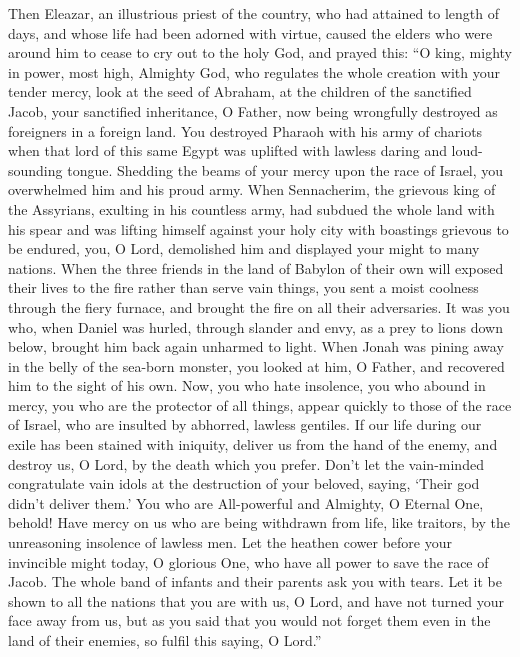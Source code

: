  Then Eleazar, an illustrious priest of the country, who had
attained to length of days, and whose life had been adorned with virtue,
caused the elders who were around him to cease to cry out to the holy
God, and prayed this:  ``O king, mighty in power, most high,
Almighty God, who regulates the whole creation with your tender mercy,
 look at the seed of Abraham, at the children of the
sanctified Jacob, your sanctified inheritance, O Father, now being
wrongfully destroyed as foreigners in a foreign land.  You
destroyed Pharaoh with his army of chariots when that lord of this same
Egypt was uplifted with lawless daring and loud-sounding tongue.
Shedding the beams of your mercy upon the race of Israel, you
overwhelmed him and his proud army.  When Sennacherim, the
grievous king of the Assyrians, exulting in his countless army, had
subdued the whole land with his spear and was lifting himself against
your holy city with boastings grievous to be endured, you, O Lord,
demolished him and displayed your might to many nations. 
When the three friends in the land of Babylon of their own will exposed
their lives to the fire rather than serve vain things, you sent a moist
coolness through the fiery furnace, and brought the fire on all their
adversaries.  It was you who, when Daniel was hurled,
through slander and envy, as a prey to lions down below, brought him
back again unharmed to light.  When Jonah was pining away in
the belly of the sea-born monster, you looked at him, O Father, and
recovered him to the sight of his own.  Now, you who hate
insolence, you who abound in mercy, you who are the protector of all
things, appear quickly to those of the race of Israel, who are insulted
by abhorred, lawless gentiles.  If our life during our
exile has been stained with iniquity, deliver us from the hand of the
enemy, and destroy us, O Lord, by the death which you prefer.
 Don't let the vain-minded congratulate vain idols at the
destruction of your beloved, saying, `Their god didn't deliver them.'
 You who are All-powerful and Almighty, O Eternal One,
behold! Have mercy on us who are being withdrawn from life, like
traitors, by the unreasoning insolence of lawless men.  Let
the heathen cower before your invincible might today, O glorious One,
who have all power to save the race of Jacob.  The whole
band of infants and their parents ask you with tears.  Let
it be shown to all the nations that you are with us, O Lord, and have
not turned your face away from us, but as you said that you would not
forget them even in the land of their enemies, so fulfil this saying, O
Lord.''

